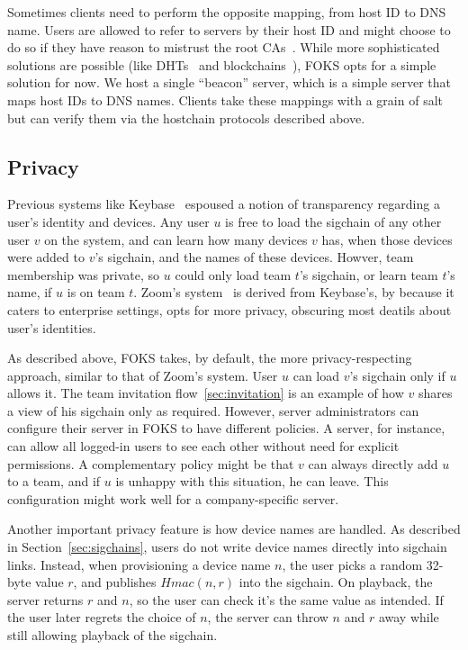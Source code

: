 Sometimes clients need to perform the opposite mapping, from host ID
to DNS name. Users are allowed to refer to servers by their host ID
and might choose to do so if they have reason to mistrust the 
root CAs~\cite{diginotar}. While more sophisticated solutions are possible
(like DHTs~\cite{chord} and blockchains~\cite{bitcoin}), FOKS opts for a simple
solution for now. We host a single ``beacon'' server, which is a simple
server that maps host IDs to DNS names. Clients take these mappings
with a grain of salt but can verify them via the hostchain protocols
described above.

\subsection{Privacy}
\label{sec:sigchain-viz}

Previous systems like Keybase~\cite{keybase} espoused a notion of transparency
regarding a user's identity and devices. Any user $u$ is free to load the 
sigchain of any other user $v$ on the system, and can learn how many devices $v$
has, when those devices were added to $v$'s sigchain, and the names of these
devices. Howver, team membership was private, so $u$ could only load team $t$'s
sigchain, or learn team $t$'s name, if $u$ is on team $t$.  Zoom's
system~\cite{zoom-privacy} is derived from Keybase's, by because it caters to
enterprise settings, opts for more privacy, obscuring most deatils about user's
identities.

As described above, FOKS takes, by default, the more privacy-respecting
approach, similar to that of Zoom's system. User $u$ can load $v$'s sigchain
only if $u$ allows it. The team invitation flow~\ref{sec:invitation} is an
example of how $v$ shares a view of his sigchain only as required.  However,
server administrators can configure their server in FOKS to have different
policies.  A server, for instance, can allow all logged-in users to see each
other without need for explicit permissions. A complementary policy might be
that $v$ can always directly add $u$ to a team, and if $u$ is unhappy with this
situation, he can leave. This configuration might work well for a
company-specific server.

Another important privacy feature is how device names are handled. As
described in Section~\ref{sec:sigchains}, users do not write 
device names directly into sigchain links.  Instead, when provisioning
a device name $n$, the user picks a random 32-byte value $r$, and publishes
$Hmac(n, r)$ into the sigchain. On playback, the server returns $r$ and $n$, 
so the user can check it's the same value as intended. If the user later
regrets the choice of $n$, the server can throw $n$ and $r$ away while
still allowing playback of the sigchain.
